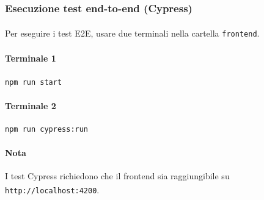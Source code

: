 \documentclass[a4paper,11pt]{article}
\newcommand{\G}{\textsubscript{\scalebox{0.6}{\textbf{G}}}}
\begin{document}
\subsubsection{Esecuzione test\G{} end-to-end (Cypress)}

Per eseguire i test\G{} E2E, usare due terminali nella cartella \texttt{frontend}.

\paragraph{Terminale 1}
\begin{verbatim}
npm run start
\end{verbatim}

\paragraph{Terminale 2}
\begin{verbatim}
npm run cypress:run
\end{verbatim}

\paragraph{Nota}
I test\G{} Cypress richiedono che il frontend\G{} sia raggiungibile su \texttt{http://localhost:4200}.
\end{document}
